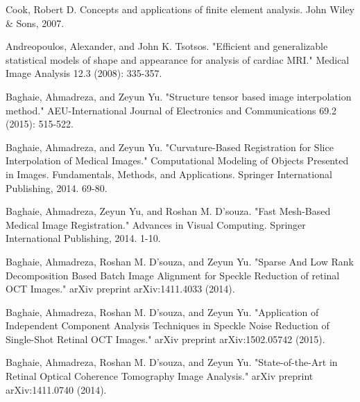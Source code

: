 \documentclass{jicspack}
\begin{document}
\begin{thebibliography}{99}
 Cook, Robert D. Concepts and applications of finite element analysis. John Wiley \& Sons, 2007.

 Andreopoulos, Alexander, and John K. Tsotsos. "Efficient and generalizable statistical models of shape and appearance for analysis of cardiac MRI." Medical Image Analysis 12.3 (2008): 335-357.

 Baghaie, Ahmadreza, and Zeyun Yu. "Structure tensor based image interpolation method." AEU-International Journal of Electronics and Communications 69.2 (2015): 515-522.

 Baghaie, Ahmadreza, and Zeyun Yu. "Curvature-Based Registration for Slice Interpolation of Medical Images." Computational Modeling of Objects Presented in Images. Fundamentals, Methods, and Applications. Springer International Publishing, 2014. 69-80.

 Baghaie, Ahmadreza, Zeyun Yu, and Roshan M. D’souza. "Fast Mesh-Based Medical Image Registration." Advances in Visual Computing. Springer International Publishing, 2014. 1-10.

 Baghaie, Ahmadreza, Roshan M. D'souza, and Zeyun Yu. "Sparse And Low Rank Decomposition Based Batch Image Alignment for Speckle Reduction of retinal OCT Images." arXiv preprint arXiv:1411.4033 (2014).

 Baghaie, Ahmadreza, Roshan M. D'souza, and Zeyun Yu. "Application of Independent Component Analysis Techniques in Speckle Noise Reduction of Single-Shot Retinal OCT Images." arXiv preprint arXiv:1502.05742 (2015).

 Baghaie, Ahmadreza, Roshan M. D'souza, and Zeyun Yu. "State-of-the-Art in Retinal Optical Coherence Tomography Image Analysis." arXiv preprint arXiv:1411.0740 (2014).


\end{thebibliography}
\end{document}
